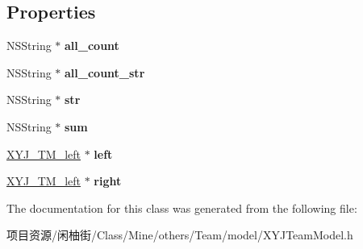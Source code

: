 \subsection*{Properties}
\begin{DoxyCompactItemize}
\item 
\mbox{\label{interface_x_y_j_team_model_a103eb03033e255f41740be7b12e026b1}} 
N\+S\+String $\ast$ {\bfseries all\+\_\+count}
\item 
\mbox{\label{interface_x_y_j_team_model_afc30e74460d5f76811069cbc38faaad5}} 
N\+S\+String $\ast$ {\bfseries all\+\_\+count\+\_\+str}
\item 
\mbox{\label{interface_x_y_j_team_model_a448b717dd509b135eac3c1acdafcf71a}} 
N\+S\+String $\ast$ {\bfseries str}
\item 
\mbox{\label{interface_x_y_j_team_model_a46f6a0875a00f03c0ee0216c4c8f5983}} 
N\+S\+String $\ast$ {\bfseries sum}
\item 
\mbox{\label{interface_x_y_j_team_model_a1637ffed8ac0a74030bfffc257da33c1}} 
\mbox{\hyperlink{interface_x_y_j___t_m__left}{X\+Y\+J\+\_\+\+T\+M\+\_\+left}} $\ast$ {\bfseries left}
\item 
\mbox{\label{interface_x_y_j_team_model_a0bf57ef3e4a7bc7282d78264e32372b4}} 
\mbox{\hyperlink{interface_x_y_j___t_m__left}{X\+Y\+J\+\_\+\+T\+M\+\_\+left}} $\ast$ {\bfseries right}
\end{DoxyCompactItemize}


The documentation for this class was generated from the following file\+:\begin{DoxyCompactItemize}
\item 
项目资源/闲柚街/\+Class/\+Mine/others/\+Team/model/X\+Y\+J\+Team\+Model.\+h\end{DoxyCompactItemize}
